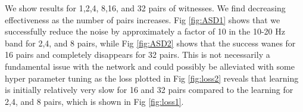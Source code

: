\begin{refsection}

We show results for 1,2,4, 8,16, and 32 pairs of witnesses. We find decreasing effectiveness as the number of pairs increases. Fig \ref{fig:ASD1} shows that we successfully reduce the noise by approximately a factor of 10 in the 10-20 Hz band for 2,4, and 8 pairs, while Fig \ref{fig:ASD2} shows that the success wanes for 16 pairs and completely disappears for 32 pairs. This is not necessarily a fundamental issue with the network and could possibly be alleviated with some hyper parameter tuning as the loss plotted in Fig \ref{fig:loss2} reveals that learning is initially relatively very slow for 16 and 32 pairs compared to the learning for 2,4, and 8 pairs, which is shown in Fig \ref{fig:loss1}. 


\end{refsection}
